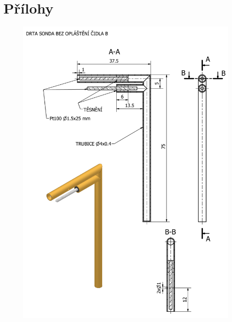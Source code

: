 \section*{Přílohy}
 \label{fig:sonda-bez-stineni-B-vykres}
    \begin{figure}[ht!]
        \centering
        \includegraphics[width=\textwidth]{400_SIMULACE_KONSTRUKCNICH_UPRAV/Vykresy_rendery/Sonda_bez_stineni_B_vykres.png}
        
    \end{figure}
    \newpage
{} \label{fig:sonda-se-stinenim-B-vykres}
